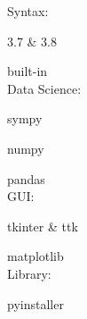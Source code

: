 \documentclass[10pt,A4]{article}
\begin{document}
\begin{minipage}{0.59\textwidth}
{		%
		\parbox[b][70pt][c]{0.3\textwidth}{
		
		\textcolor{textcol}{\faCode \hspace{1pt} Syntax:}
		
		\hspace{10pt}
		\textcolor{textcol}{\faPython \hspace{1pt} 3.7 \& 3.8}
		
		\hspace{10pt}	 		
		\textcolor{textcol}{\faTerminal\hspace{1pt} built-in}\\
			 		
		\textcolor{textcol}{\faChartPie \hspace{1pt} Data Science:}
		
		\hspace{10pt}	 		
		\textcolor{textcol}{\faSuperscript \hspace{1.5pt} sympy}
		
		\hspace{10pt}	 		
		\textcolor{textcol}{\faSortNumericDown \hspace{2pt} numpy}	
		
		\hspace{10pt}	 		
		\textcolor{textcol}{\faTable \hspace{1pt} pandas}\\
		
		\textcolor{textcol}{\faLaptopCode \hspace{1pt} GUI:}
			
		\hspace{10pt}  		
		\textcolor{textcol}{\faFeather \hspace{1pt} tkinter \& ttk}	
		
		\hspace{10pt}			 		
		\textcolor{textcol}{\faChartArea \hspace{1pt} matplotlib}\\
			 		
		\textcolor{textcol}{\faBoxes \hspace{1pt} Library:}
		
		\hspace{10pt}	 		
		\textcolor{textcol}{\faDAndD \hspace{1pt} pyinstaller}
		}
	}
	

\end{minipage}
\end{document}
